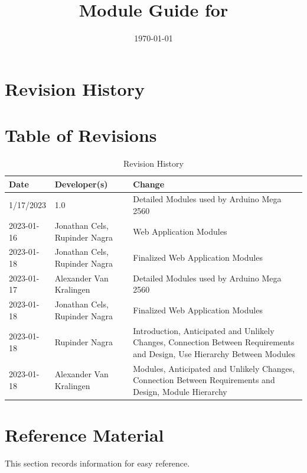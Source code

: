 \documentclass[12pt, titlepage]{article}
\begin{document}
\title{Module Guide for \progname{}} 
\author{\authname}
\date{\today}

\maketitle


\section{Revision History}

\section*{Table of Revisions}
\begin{table}[hp]
\caption{Revision History} \label{TblRevisionHistory}
\begin{tabularx}{\textwidth}{llX}
\toprule
\textbf{Date} & \textbf{Developer(s)} & \textbf{Change}\\
\midrule
1/17/2023 & 1.0 & Detailed Modules used by Arduino Mega 2560\\
2023-01-16 & Jonathan Cels, Rupinder Nagra & Web Application Modules\\
2023-01-18 & Jonathan Cels, Rupinder Nagra & Finalized Web Application Modules\\
2023-01-17 & Alexander Van Kralingen & Detailed Modules used by Arduino Mega 2560\\
2023-01-18 & Jonathan Cels, Rupinder Nagra & Finalized Web Application Modules\\
2023-01-18 & Rupinder Nagra & Introduction, Anticipated and Unlikely Changes, Connection Between Requirements and Design, Use Hierarchy Between Modules\\
2023-01-18 & Alexander Van Kralingen & Modules, Anticipated and Unlikely Changes, Connection Between Requirements and Design, Module Hierarchy\\

\bottomrule
\end{tabularx}
\end{table}

\newpage

\section{Reference Material}

This section records information for easy reference.
\end{document}
